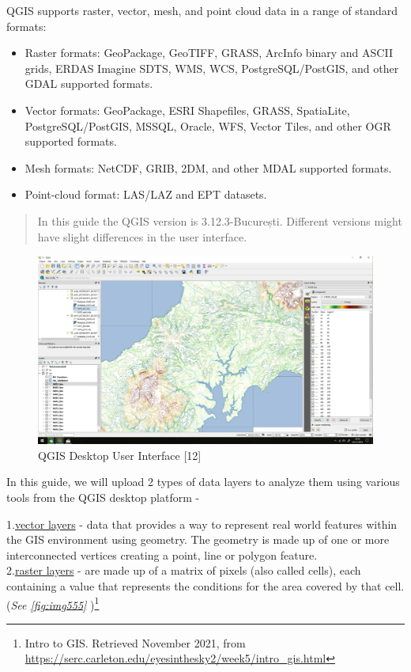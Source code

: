 \documentclass[
]{book}
\providecommand{\tightlist}{%
  \setlength{\itemsep}{0pt}\setlength{\parskip}{0pt}}
\begin{document}
QGIS supports raster, vector, mesh, and point cloud data in a range of standard formats:

\begin{itemize}
\tightlist
\item
  Raster formats: GeoPackage, GeoTIFF, GRASS, ArcInfo binary and ASCII grids, ERDAS Imagine SDTS, WMS, WCS, PostgreSQL/PostGIS, and other GDAL supported formats.
\item
  Vector formats: GeoPackage, ESRI Shapefiles, GRASS, SpatiaLite, PostgreSQL/PostGIS, MSSQL, Oracle, WFS, Vector Tiles, and other OGR supported formats.
\item
  Mesh formats: NetCDF, GRIB, 2DM, and other MDAL supported formats.
\item
  Point-cloud format: LAS/LAZ and EPT datasets.
\end{itemize}

\begin{quote}
In this guide the QGIS version is 3.12.3-București. Different versions might have slight differences in the user interface.
\end{quote}

\begin{figure}

{\centering \includegraphics[width=1\linewidth]{images/qgis_example} 

}

\caption{QGIS Desktop User Interface [12]}\label{fig:img4}
\end{figure}

In this guide, we will upload 2 types of data layers to analyze them using various tools from the QGIS desktop platform -

1.\href{https://docs.qgis.org/2.8/en/docs/gentle_gis_introduction/vector_data.html}{vector layers} - data that provides a way to represent real world features within the GIS environment using geometry. The geometry is made up of one or more interconnected vertices creating a point, line or polygon feature.\\
2.\href{https://docs.qgis.org/2.8/en/docs/gentle_gis_introduction/raster_data.html}{raster layers} - are made up of a matrix of pixels (also called cells), each containing a value that represents the conditions for the area covered by that cell. (\emph{See \ref{fig:img555}} )\footnote{Intro to GIS. Retrieved November 2021, from \url{https://serc.carleton.edu/eyesinthesky2/week5/intro_gis.html}}
\end{document}
